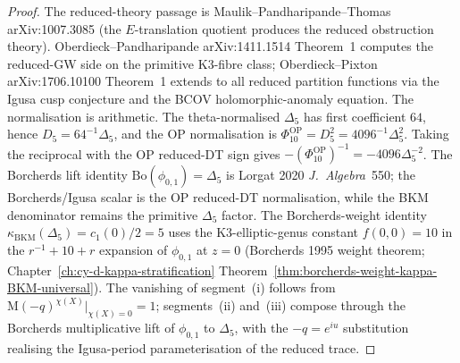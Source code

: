 \begin{proof}
The reduced-theory passage is Maulik--Pandharipande--Thomas
\textup{arXiv:1007.3085} (the $E$-translation quotient produces the
reduced obstruction theory). Oberdieck--Pandharipande
\textup{arXiv:1411.1514} Theorem~1 computes the reduced-GW side on
the primitive K3-fibre class; Oberdieck--Pixton
\textup{arXiv:1706.10100} Theorem~1 extends to all reduced partition
functions via the Igusa cusp conjecture and the BCOV
holomorphic-anomaly equation. The normalisation is arithmetic. The
theta-normalised $\Delta_5$ has first coefficient $64$, hence
$D_5=64^{-1}\Delta_5$, and the OP normalisation is
$\Phi_{10}^{\mathrm{OP}}=D_5^2=4096^{-1}\Delta_5^2$. Taking the
reciprocal with the OP reduced-DT sign gives
$-(\Phi_{10}^{\mathrm{OP}})^{-1}=-4096\Delta_5^{-2}$.
The Borcherds lift identity
$\mathrm{Bo}(\phi_{0,1}) = \Delta_{5}$ is Lorgat 2020
\emph{J.~Algebra}~550; the Borcherds/Igusa scalar is the OP reduced-DT
normalisation, while the BKM denominator remains the
primitive $\Delta_5$ factor. The Borcherds-weight identity
$\kappa_{\mathrm{BKM}}(\Delta_{5}) = c_{1}(0)/2 = 5$ uses the
K3-elliptic-genus constant $f(0,0) = 10$ in the
$r^{-1} + 10 + r$ expansion of $\phi_{0,1}$ at $z = 0$
(Borcherds 1995 weight theorem;
Chapter~\ref{ch:cy-d-kappa-stratification}
Theorem~\ref{thm:borcherds-weight-kappa-BKM-universal}). The
vanishing of segment~(i) follows from
$\mathrm{M}(-q)^{\chi(X)}|_{\chi(X) = 0} = 1$; segments~(ii) and~(iii)
compose through the Borcherds multiplicative lift of $\phi_{0,1}$ to
$\Delta_{5}$, with the $-q = e^{iu}$ substitution realising the
Igusa-period parameterisation of the reduced trace.
\end{proof}

